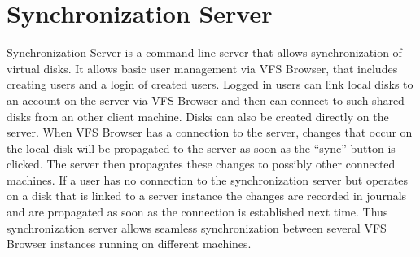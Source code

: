 \documentclass[a4paper,12pt]{article}
\begin{document}






\section{Synchronization Server}

Synchronization Server is a command line server that allows synchronization of
virtual disks. It allows basic user management via VFS Browser, that includes
creating users and a login of created users. Logged in users can link local
disks to an account on the server via VFS Browser and then can connect to such
shared disks from an other client machine. Disks can also be created directly on
the server. When VFS Browser has a connection to the server, changes that occur
on the local disk will be propagated to the server as soon as the ``sync''
button is clicked. The server then propagates these changes to possibly
other connected machines. If a user has no connection to the synchronization
server but operates on a disk that is linked to a server instance the changes
are recorded in journals and are propagated as soon as the connection is
established next time. Thus synchronization server allows seamless
synchronization between several VFS Browser instances running on different machines.













\end{document}
